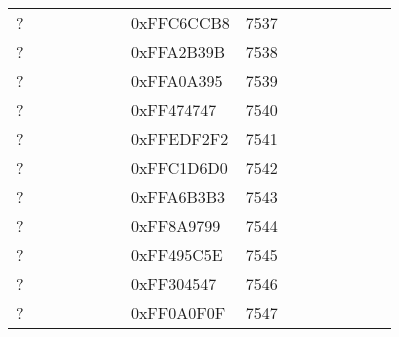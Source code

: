 \begin{longtable}{p{0.3\linewidth} p{0.3\linewidth} p{0.4\linewidth}}
? &  0xFFC6CCB8 &  7537\\
? &  0xFFA2B39B &  7538\\
? &  0xFFA0A395 &  7539\\
? &  0xFF474747 &  7540\\
? &  0xFFEDF2F2 &  7541\\
? &  0xFFC1D6D0 &  7542\\
? &  0xFFA6B3B3 &  7543\\
? &  0xFF8A9799 &  7544\\
? &  0xFF495C5E &  7545\\
? &  0xFF304547 &  7546\\
? &  0xFF0A0F0F &  7547\\

\end{longtable}
